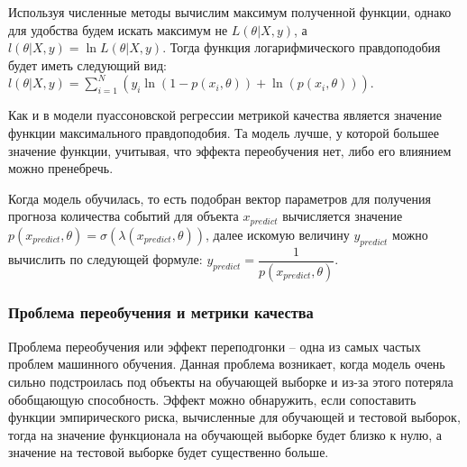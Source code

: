 Используя численные методы вычислим максимум полученной функции, однако для удобства будем искать максимум не $L(\theta | X,y)$, а $l(\theta | X,y) = \ln L(\theta | X,y)$. Тогда функция логарифмического правдоподобия будет иметь следующий вид: $l(\theta | X,y) = \sum\limits_{i = 1}^N ( y_i \ln(1 - p(x_i,\theta)) + \ln(p(x_i,\theta)) )$.

Как и в модели пуассоновской регрессии метрикой качества является значение функции максимального правдоподобия. Та модель лучше, у которой большее значение функции, учитывая, что эффекта переобучения нет, либо его влиянием можно пренебречь.

Когда модель обучилась, то есть подобран вектор параметров для получения прогноза количества событий для объекта $x_{predict}$ вычисляется значение $p(x_{predict}, \theta) = \sigma(\lambda(x_{predict}, \theta))$, далее искомую величину $y_{predict}$ можно вычислить по следующей формуле: $y_{predict} = \dfrac{1}{p(x_{predict}, \theta)}$.

\subsubsection{Проблема переобучения и метрики качества}

Проблема переобучения или эффект переподгонки -- одна из самых частых проблем машинного обучения. Данная проблема возникает, когда модель очень сильно подстроилась под объекты на обучающей выборке и из-за этого потеряла обобщающую способность. Эффект можно обнаружить, если сопоставить функции эмпирического риска, вычисленные для обучающей и тестовой выборок, тогда на значение функционала на обучающей выборке будет близко к нулю, а значение на тестовой выборке будет существенно больше.

